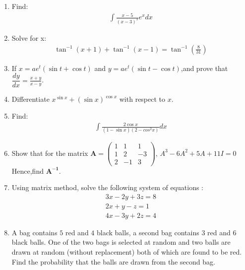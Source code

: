 \documentclass[12pt,-letter paper]{article}
\providecommand{\brak}[1]{\ensuremath{\left(#1\right)}}
\theoremstyle{remark}
\newcommand{\myvec}[1]{\ensuremath{\begin{pmatrix}#1\end{pmatrix}}}
\let\vec\mathbf
\begin{document}
\begin{enumerate}
 \item Find: 
 \begin{align*}
 \int{\frac{x-5}{\brak{x-3}^3}}e^x dx
 \end{align*}
  
\item Solve for x:
\begin{align*}
\tan^{-1}\brak{x+1}+\tan^{-1}\brak{x-1}=\tan^{-1}\brak{\frac{8}{31}}
\end{align*}

\item If ${x}=ae^t\brak{\sin{t}+\cos{t}}$ and ${y}=ae^t\brak{\sin{t}-\cos{t}}$,and prove that $\dfrac{dy}{dx}=\frac{x+y}{x-y}$.

\item Differentiate $x^{\sin x}+\brak{\sin x}^{\cos x}$ with respect to $x$.

\item Find: 
\begin{align*}
\int{\frac{2\cos x}{\brak{1-\sin x}\brak{2-cos^2 x}}}dx
\end{align*}  

\item Show that for the matrix $\vec{A}=\myvec{1&1&1 \\ 1&2&-3 \\ 2&-1&3}$, ${A}^3-6{A}^2+5{A}+11{I}=0$
Hence,find $\vec{A^{-1}}$.

\item Using matrix method, solve the following system of equations :
\begin{align*}
    {3x-2y+3z}=8 \\
    {2x+y-z}=1 \\
    {4x-3y+2z}=4
\end{align*}

\item A bag contains $5$ red and $4$ black balls, a second bag contains $3$ red and $6$ black balls. One of the two bags is selected at random and two balls are drawn at random (without replacement) both of which are found to be red. Find the probability that the balls are drawn from the second bag.
\end{enumerate}
    
\end{document}
